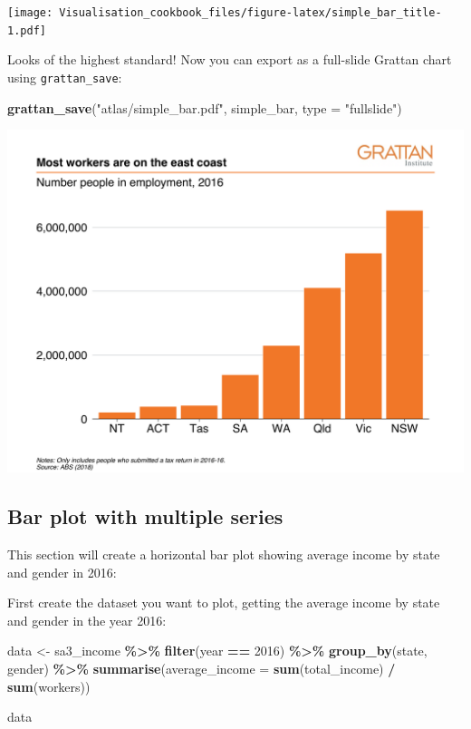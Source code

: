 \documentclass[
]{book}
\newenvironment{Shaded}{\begin{snugshade}}{\end{snugshade}}
\newcommand{\DataTypeTok}[1]{\textcolor[rgb]{0.13,0.29,0.53}{#1}}
\newcommand{\DecValTok}[1]{\textcolor[rgb]{0.00,0.00,0.81}{#1}}
\newcommand{\KeywordTok}[1]{\textcolor[rgb]{0.13,0.29,0.53}{\textbf{#1}}}
\newcommand{\NormalTok}[1]{#1}
\newcommand{\OperatorTok}[1]{\textcolor[rgb]{0.81,0.36,0.00}{\textbf{#1}}}
\newcommand{\StringTok}[1]{\textcolor[rgb]{0.31,0.60,0.02}{#1}}
\begin{document}
\texttt{[image: Visualisation\_cookbook\_files/figure-latex/simple\_bar\_title-1.pdf]}

Looks of the highest standard! Now you can export as a full-slide Grattan chart using \texttt{grattan\_save}:

\begin{Shaded}
\begin{Highlighting}[]
\KeywordTok{grattan\_save}\NormalTok{(}\StringTok{"atlas/simple\_bar.pdf"}\NormalTok{, simple\_bar, }\DataTypeTok{type =} \StringTok{"fullslide"}\NormalTok{)}
\end{Highlighting}
\end{Shaded}

\includegraphics[width=44.44in]{atlas/simple_bar}

\hypertarget{bar-multi}{%
\subsection{Bar plot with multiple series}\label{bar-multi}}

This section will create a horizontal bar plot showing average income by state and gender in 2016:

First create the dataset you want to plot, getting the average income by state and gender in the year 2016:

\begin{Shaded}
\begin{Highlighting}[]
\NormalTok{data \textless{}{-}}\StringTok{ }\NormalTok{sa3\_income }\OperatorTok{\%\textgreater{}\%}\StringTok{ }
\StringTok{  }\KeywordTok{filter}\NormalTok{(year }\OperatorTok{==}\StringTok{ }\DecValTok{2016}\NormalTok{) }\OperatorTok{\%\textgreater{}\%}\StringTok{   }
\StringTok{  }\KeywordTok{group\_by}\NormalTok{(state, gender) }\OperatorTok{\%\textgreater{}\%}\StringTok{   }
\StringTok{  }\KeywordTok{summarise}\NormalTok{(}\DataTypeTok{average\_income =} \KeywordTok{sum}\NormalTok{(total\_income) }\OperatorTok{/}\StringTok{ }\KeywordTok{sum}\NormalTok{(workers))}

\NormalTok{data}
\end{Highlighting}
\end{Shaded}
\end{document}

